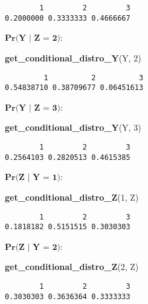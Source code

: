 \documentclass[
]{article}
\newenvironment{Shaded}{\begin{snugshade}}{\end{snugshade}}
\newcommand{\DecValTok}[1]{\textcolor[rgb]{0.00,0.00,0.81}{#1}}
\newcommand{\FunctionTok}[1]{\textcolor[rgb]{0.13,0.29,0.53}{\textbf{#1}}}
\newcommand{\NormalTok}[1]{#1}
\begin{document}
\begin{verbatim}
        1         2         3 
0.2000000 0.3333333 0.4666667 
\end{verbatim}

\(\textbf{Pr(Y | Z = 2)}\):

\begin{Shaded}
\begin{Highlighting}[]
\FunctionTok{get\_conditional\_distro\_Y}\NormalTok{(Y, }\DecValTok{2}\NormalTok{)}
\end{Highlighting}
\end{Shaded}

\begin{verbatim}
         1          2          3 
0.54838710 0.38709677 0.06451613 
\end{verbatim}

\(\textbf{Pr(Y | Z = 3)}\):

\begin{Shaded}
\begin{Highlighting}[]
\FunctionTok{get\_conditional\_distro\_Y}\NormalTok{(Y, }\DecValTok{3}\NormalTok{)}
\end{Highlighting}
\end{Shaded}

\begin{verbatim}
        1         2         3 
0.2564103 0.2820513 0.4615385 
\end{verbatim}

\(\textbf{Pr(Z | Y = 1)}\):

\begin{Shaded}
\begin{Highlighting}[]
\FunctionTok{get\_conditional\_distro\_Z}\NormalTok{(}\DecValTok{1}\NormalTok{, Z)}
\end{Highlighting}
\end{Shaded}

\begin{verbatim}
        1         2         3 
0.1818182 0.5151515 0.3030303 
\end{verbatim}

\(\textbf{Pr(Z | Y = 2)}\):

\begin{Shaded}
\begin{Highlighting}[]
\FunctionTok{get\_conditional\_distro\_Z}\NormalTok{(}\DecValTok{2}\NormalTok{, Z)}
\end{Highlighting}
\end{Shaded}

\begin{verbatim}
        1         2         3 
0.3030303 0.3636364 0.3333333 
\end{verbatim}
\end{document}
